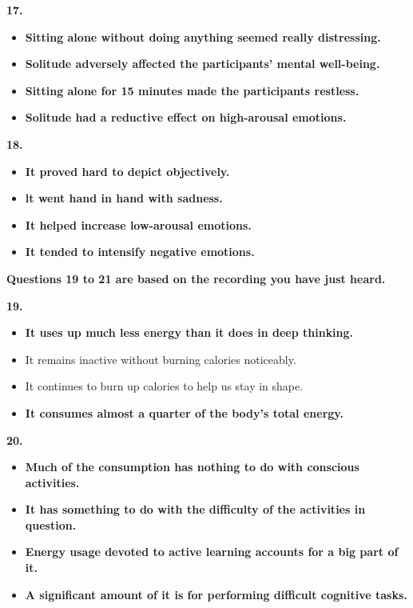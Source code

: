 \documentclass[UTF8,11pt]{ctexart}
\begin{document}
\textbf{17.}


\begin{itemize}[leftmargin=2em,itemsep=.2em,topsep=.4em]\item[A.] \textbf{Sitting alone without doing anything seemed really distressing.}
\item[B.] \textbf{Solitude adversely affected the participants' mental well-being.}
\item[C.] \textbf{Sitting alone for 15 minutes made the participants restless.}
\item[D.] \textbf{Solitude had a reductive effect on high-arousal emotions.}
\end{itemize}

\textbf{18.}


\begin{itemize}[leftmargin=2em,itemsep=.2em,topsep=.4em]\item[A.] \textbf{It proved hard to depict objectively.}
\item[B.] \textbf{lt went hand in hand with sadness.}
\item[C.] \textbf{It helped increase low-arousal emotions.}
\item[D.] \textbf{It tended to intensify negative emotions.}
\end{itemize}

\textbf{Questions 19 to 21 are based on the recording you have just heard.}


\textbf{19.}


\begin{itemize}[leftmargin=2em,itemsep=.2em,topsep=.4em]\item[A.] \textbf{It uses up much less energy than it does in deep thinking.}
\item[B.] It remains inactive without burning calories noticeably.
\item[C.] It continues to burn up calories to help us stay in shape.
\item[D.] \textbf{It consumes almost a quarter of the body's total energy.}
\end{itemize}

\textbf{20.}


\begin{itemize}[leftmargin=2em,itemsep=.2em,topsep=.4em]\item[A.] \textbf{Much of the consumption has nothing to do with conscious activities.}
\item[B.] \textbf{It has something to do with the difficulty of the activities in question.}
\item[C.] \textbf{Energy usage devoted to active learning accounts for a big part of it.}
\item[D.] \textbf{A significant amount of it is for performing difficult cognitive tasks.}
\end{itemize}
\end{document}
